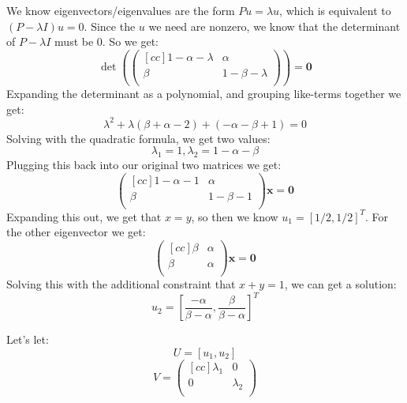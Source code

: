 \begin{enumerate}
\begin{enumerate}
        We know eigenvectors/eigenvalues are the form $Pu = \lambda u$, which is equivalent to $(P - \lambda I)u = 0$. Since the $u$ we need are nonzero, we know that the determinant of $P - \lambda I$ must be 0. So we get:
        $$
        \det(
        \begin{pmatrix}[cc]
          1-\alpha-\lambda & \alpha\\
          \beta    & 1-\beta-\lambda\\
        \end{pmatrix}        
        )
        = \textbf{0}
        $$
        Expanding the determinant as a polynomial, and grouping like-terms together we get:
        $$\lambda^2 + \lambda(\beta + \alpha - 2) + (-\alpha - \beta + 1) = 0$$
        Solving with the quadratic formula, we get two values:
        $$\lambda_1 = 1, \lambda_2 = 1 - \alpha - \beta$$
        Plugging this back into our original two matrices we get:
        $$
        \begin{pmatrix}[cc]
          1-\alpha-1 & \alpha\\
          \beta    & 1-\beta-1\\
        \end{pmatrix}
        \textbf{x}
        =
        \textbf{0}
        $$
        Expanding this out, we get that $x=y$, so then we know $u_1 = [1/2, 1/2]^T$. For the other eigenvector we get:
        $$
        \begin{pmatrix}[cc]
          \beta & \alpha\\
          \beta & \alpha\\
        \end{pmatrix}
        \textbf{x}
        =
        \textbf{0}
        $$
        Solving this with the additional constraint that $x + y = 1$, we can get a solution:
        $$u_2 = [\frac{-\alpha}{\beta - \alpha}, \frac{\beta}{\beta - \alpha}]^T$$

        Let's let:
        $$U = [u_1,u_2]$$
        $$
        V 
        =
        \begin{pmatrix}[cc]
          \lambda_1 & 0\\
          0 & \lambda_2\\
        \end{pmatrix}
        $$


\end{enumerate}
\end{enumerate}
